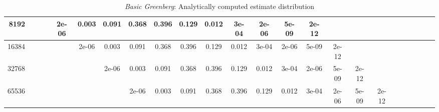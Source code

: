 \begin{appendices}
\begin{sidewaystable}
{\begin{tabular}{r|ccccccccccccccccccccccc}
8192 &&&&2e-06 &0.003 &0.091 &0.368 &0.396 &0.129 &0.012 &3e-04 &2e-06 &5e-09 &2e-12 &&&\\\hline

16384 &&&&&2e-06 &0.003 &0.091 &0.368 &0.396 &0.129 &0.012 &3e-04 &2e-06 &5e-09 &2e-12 &&\\\hline

32768 &&&&&&2e-06 &0.003 &0.091 &0.368 &0.396 &0.129 &0.012 &3e-04 &2e-06 &5e-09 &2e-12 &\\\hline

65536 &&&&&&&2e-06 &0.003 &0.091 &0.368 &0.396 &0.129 &0.012 &3e-04 &2e-06 &5e-09 &2e-12\\

\bottomrule
\end{tabular}
}
\caption{\emph{Basic Greenberg}: Analytically computed estimate distribution}
\label{basic-greenberg-stop-probabilities}

\end{sidewaystable}


\clearpage

\end{appendices}
